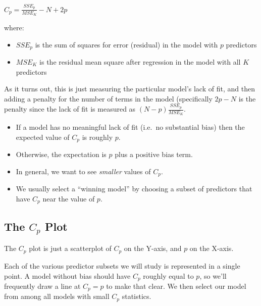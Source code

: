 \documentclass[]{book}
\providecommand{\tightlist}{%
  \setlength{\itemsep}{0pt}\setlength{\parskip}{0pt}}
\theoremstyle{definition}
\theoremstyle{definition}
\theoremstyle{definition}
\theoremstyle{remark}
\begin{document}
\(C_p = \frac{SSE_p}{MSE_K} - N + 2p\)

where:

\begin{itemize}
\tightlist
\item
  \(SSE_p\) is the sum of squares for error (residual) in the model with
  \(p\) predictors
\item
  \(MSE_K\) is the residual mean square after regression in the model
  with all \(K\) predictors
\end{itemize}

As it turns out, this is just measuring the particular model's lack of
fit, and then adding a penalty for the number of terms in the model
(specifically \(2p - N\) is the penalty since the lack of fit is
measured as \((N-p) \frac{SSE_p}{MSE_K}\).

\begin{itemize}
\tightlist
\item
  If a model has no meaningful lack of fit (i.e.~no substantial bias)
  then the expected value of \(C_p\) is roughly \(p\).
\item
  Otherwise, the expectation is \(p\) plus a positive bias term.
\item
  In general, we want to see \emph{smaller} values of \(C_p\).
\item
  We usually select a ``winning model'' by choosing a subset of
  predictors that have \(C_p\) near the value of \(p\).
\end{itemize}

\subsection{\texorpdfstring{The \(C_p\)
Plot}{The C\_p Plot}}\label{the-c_p-plot}

The \(C_p\) plot is just a scatterplot of \(C_p\) on the Y-axis, and
\(p\) on the X-axis.

Each of the various predictor subsets we will study is represented in a
single point. A model without bias should have \(C_p\) roughly equal to
\(p\), so we'll frequently draw a line at \(C_p = p\) to make that
clear. We then select our model from among all models with small \(C_p\)
statistics.
\end{document}
